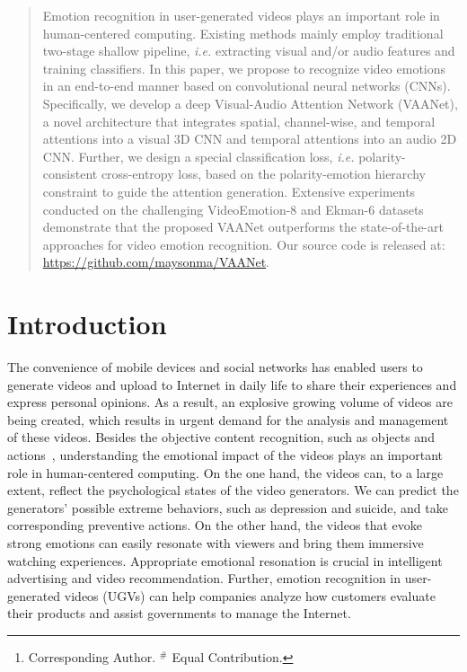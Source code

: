 \documentclass[letterpaper]{article} \usepackage{aaai20}  \usepackage{times}  \usepackage{helvet} \usepackage{courier}  \usepackage[hyphens]{url}  \usepackage{graphicx} \urlstyle{rm} \def\UrlFont{\rm}  \usepackage{graphicx}
\author{
Sicheng Zhao$^{1\#}$, Yunsheng Ma$^{23\#}$, Yang Gu$^{2}$, Jufeng Yang$^{4}$\thanks{Corresponding Author. $^{\#}$ Equal Contribution.}, \\
\Large \textbf{Tengfei Xing$^{2}$, Pengfei Xu$^{2}$, Runbo Hu$^{2}$, Hua Chai$^{2}$, Kurt Keutzer$^{1}$}\\
$^{1}$University of California, Berkeley, USA  $^{2}$Didi Chuxing, China\\
  $^{3}$Harbin Institute of Technology, Weihai, China  $^{4}$Nankai University, China\\
  schzhao@gmail.com, 
  yunsheng.ma98@gmail.com, yangjufeng@nankai.edu.cn\\
  \{guyangdavid,xingtengfei,xupengfeipf,hurunbo,chaihua\}@didiglobal.com, keutzer@berkeley.edu \\
}
\begin{document}
\maketitle

\begin{abstract}
Emotion recognition in user-generated videos plays an important role in human-centered computing. Existing methods mainly employ traditional two-stage shallow pipeline, \textit{i.e.} extracting visual and/or audio features and training classifiers. In this paper, we propose to recognize video emotions in an end-to-end manner based on convolutional neural networks (CNNs). Specifically, we develop a deep Visual-Audio Attention Network (VAANet), a novel architecture that integrates spatial, channel-wise, and temporal attentions into a visual 3D CNN and temporal attentions into an audio 2D CNN. Further, we design a special classification loss, \textit{i.e.} polarity-consistent cross-entropy loss, based on the polarity-emotion hierarchy constraint to guide the attention generation. Extensive experiments conducted on the challenging VideoEmotion-8 and Ekman-6 datasets demonstrate that the proposed VAANet outperforms the state-of-the-art approaches for video emotion recognition. Our source code is released at: \url{https://github.com/maysonma/VAANet}.
\end{abstract}



\section{Introduction}
\label{sec:Introduction}


The convenience of mobile devices and social networks has enabled users to generate videos and upload to Internet in daily life to share their experiences and express personal opinions. As a result, an explosive growing volume of videos are being created, which results in urgent demand for the analysis and management of these videos. Besides the objective content recognition, such as objects and actions~\cite{zhu2018towards,choutas2018potion}, understanding the emotional impact of the videos plays an important role in human-centered computing. On the one hand, the videos can, to a large extent, reflect the psychological states of the video generators. We can predict the generators' possible extreme behaviors, such as depression and suicide, and take corresponding preventive actions. On the other hand, the videos that evoke strong emotions can easily resonate with viewers and bring them immersive watching experiences. Appropriate emotional resonation is crucial in intelligent advertising and video recommendation. Further, emotion recognition in user-generated videos (UGVs) can help companies analyze how customers evaluate their products and assist governments to manage the Internet.
\end{document}
